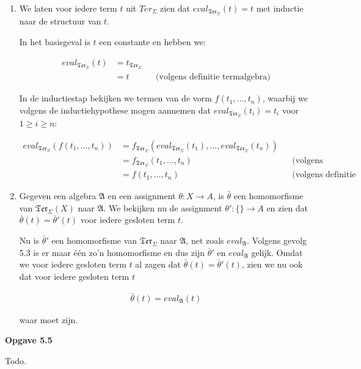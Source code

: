 \documentclass[a4paper,11pt]{article}
\begin{document}
\begin{enumerate}

\item %

We laten voor iedere term $t$ uit $Ter_{\Sigma}$ zien dat
$eval_{\mathfrak{Ter}_{\Sigma}}(t) = t$ met inductie naar de structuur van
$t$.

In het basisgeval is $t$ een constante en hebben we:

\begin{align*}
eval_{\mathfrak{Ter}_{\Sigma}}(t) &= t_{\mathfrak{Ter}_{\Sigma}} \\
                                  &= t &&\text{(volgens definitie termalgebra)}
\end{align*}

In de inductiestap bekijken we termen van de vorm $f(t_{1}, \ldots, t_{n})$,
waarbij we volgens de inductiehypothese mogen aannemen dat
$eval_{\mathfrak{Ter}_{\Sigma}}(t_{i}) = t_{i}$ voor $1 \ge i \ge n$:

\begin{align*}
eval_{\mathfrak{Ter}_{\Sigma}}(f(t_{1}, \ldots, t_{n})) &=
f_{\mathfrak{Ter}_{\Sigma}}(eval_{\mathfrak{Ter}_{\Sigma}}(t_{1}), \ldots,
eval_{\mathfrak{Ter}_{\Sigma}}(t_{n})) \\
    &= f_{\mathfrak{Ter}_{\Sigma}}(t_{1}, \ldots, t_{n}) &&\text{(volgens inductiehypothese)} \\
    &= f(t_{1}, \ldots, t_{n}) &&\text{(volgens definitie termalgebra)}
\end{align*}

\item %

Gegeven een algebra $\mathfrak{A}$ en een assignment $\theta : X \rightarrow
A$, is $\bar \theta$ een homomorfisme van $\mathfrak{Ter}_{\Sigma}(X)$ naar
$\mathfrak{A}$. We bekijken nu de assignment $\theta' : \{\} \rightarrow A$ en
zien dat $\bar \theta(t) = \bar \theta'(t)$ voor iedere gesloten term $t$.

Nu is $\bar \theta'$ een homomorfisme van $\mathfrak{Ter}_{\Sigma}$ naar
$\mathfrak{A}$, net zoals $eval_{\mathfrak{A}}$. Volgens gevolg 5.3 is er maar
\'e\'en zo'n homomorfisme en dus zijn $\bar \theta'$ en $eval_{\mathfrak{A}}$
gelijk. Omdat we voor iedere gesloten term $t$ al zagen dat $\bar \theta(t) =
\bar \theta'(t)$, zien we nu ook dat voor iedere gesloten term $t$

\begin{align*}
\bar \theta(t) = eval_{\mathfrak{A}}(t)
\end{align*}

waar moet zijn.\\[2em]

\end{enumerate}


{\bf Opgave 5.5}

Todo.
\end{document}
